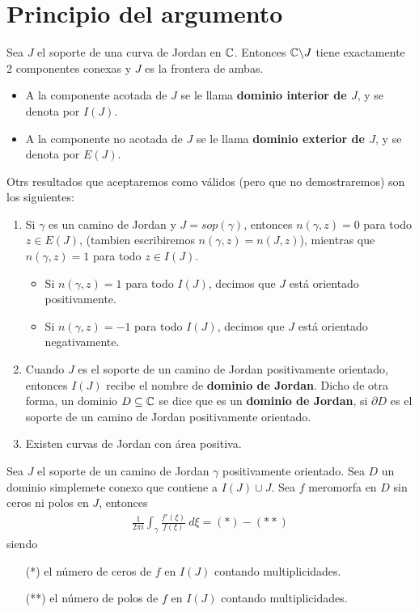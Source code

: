 \section{Principio del argumento}

\begin{teo}
    Sea $J$ el soporte de una curva de Jordan en $\mathbb{C}$. Entonces $\mathbb{C} \backslash J$ tiene exactamente 2 componentes conexas y $J$ es la frontera de ambas.
    \begin{itemize}
        \item A la componente acotada de $J$ se le llama \textbf{dominio interior de $J$}, y se denota por $I(J)$.
        \item A la componente no acotada de $J$ se le llama \textbf{dominio exterior de $J$}, y se denota por $E(J)$.
    \end{itemize}
\end{teo}

Otrs resultados que aceptaremos como válidos (pero que no demostraremos) son los siguientes:
\begin{enumerate}
    \item Si $\gamma$ es un camino de Jordan y $J = sop(\gamma)$, entonces $n(\gamma,z) = 0$ para todo $z \in E(J)$, (tambien escribiremos $n(\gamma,z) = n(J,z)$), mientras que $n(\gamma,z) = 1$ para todo $z \in I(J)$.
          \begin{itemize}
              \item Si $n(\gamma,z) = 1$ para todo $I(J)$, decimos que $J$ está orientado positivamente.
              \item Si $n(\gamma,z) = -1$ para todo $I(J)$, decimos que $J$ está orientado negativamente.
          \end{itemize}
    \item Cuando $J$ es el soporte de un camino de Jordan positivamente orientado, entonces $I(J)$ recibe el nombre de \textbf{dominio de Jordan}. Dicho de otra forma, un dominio $D \subseteq \mathbb{C}$ se dice que es un \textbf{dominio de Jordan}, si $\partial D$ es el soporte de un camino de Jordan positivamente orientado.
    \item Existen curvas de Jordan con área positiva.
\end{enumerate}

\begin{teo}
    Sea $J$ el soporte de un camino de Jordan $\gamma$ positivamente orientado. Sea $D$ un dominio simplemete conexo que contiene a $I(J) \cup J$. Sea $f$ meromorfa en $D$ sin ceros ni polos en $J$, entonces
    \begin{align*}
        \frac{1}{2\pi i} \int_{\gamma} \frac{f'(\xi)}{f(\xi)} \ d\xi = (*) - (**)
    \end{align*}
    siendo
    \begin{enumerate}
        \item[(*)] el número de ceros de $f$ en $I(J)$ contando multiplicidades.
        \item[(**)] el número de polos de $f$ en $I(J)$ contando multiplicidades.
    \end{enumerate}
\end{teo}

